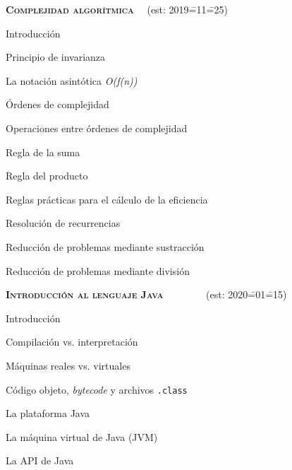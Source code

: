 \begin{longenum}
\begin{longenum}
\begin{longenum}
\begin{longenum}
            \end{longenum}
        \end{longenum}
    \end{longenum}
    \item \textbf{\textsc{Complejidad algorítmica}} \ \opcional\ (est: 2019\==11\==25)
    \begin{longenum}
        \item Introducción
        \item Principio de invarianza
        \item La notación asintótica \textit{O(f(n))}
        \item Órdenes de complejidad
        \item Operaciones entre órdenes de complejidad
        \begin{longenum}
            \item Regla de la suma
            \item Regla del producto
        \end{longenum}
        \item Reglas prácticas para el cálculo de la eficiencia
        \item Resolución de recurrencias
        \begin{longenum}
            \item Reducción de problemas mediante sustracción
            \item Reducción de problemas mediante división
        \end{longenum}
    \end{longenum}
    \item \textbf{\textsc{Introducción al lenguaje Java}} \ \ \ \ \ \ \ \ (est: 2020\==01\==15)
    \begin{longenum}
        \item Introducción
        \item Compilación vs. interpretación
        \begin{longenum}
            \item Máquinas reales vs. virtuales
            \item Código objeto, \textit{bytecode} y archivos \texttt{.class}
            \item La plataforma Java
            \begin{longenum}
                \item La máquina virtual de Java (JVM)
                \item La API de Java

\end{longenum}
\end{longenum}
\end{longenum}
\end{longenum}
